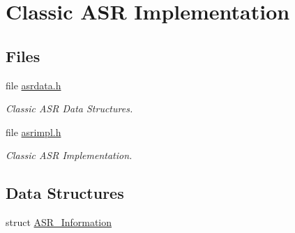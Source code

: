 \hypertarget{group__ClassicASRImpl}{}\section{Classic A\+SR Implementation}
\label{group__ClassicASRImpl}
\subsection*{Files}
\begin{DoxyCompactItemize}
\item 
file \mbox{\hyperlink{asrdata_8h}{asrdata.\+h}}
\begin{DoxyCompactList}\small\item\em Classic A\+SR Data Structures. \end{DoxyCompactList}\item 
file \mbox{\hyperlink{asrimpl_8h}{asrimpl.\+h}}
\begin{DoxyCompactList}\small\item\em Classic A\+SR Implementation. \end{DoxyCompactList}\end{DoxyCompactItemize}
\subsection*{Data Structures}
\begin{DoxyCompactItemize}
\item 
struct \mbox{\hyperlink{structASR__Information}{A\+S\+R\+\_\+\+Information}}
\end{DoxyCompactItemize}
